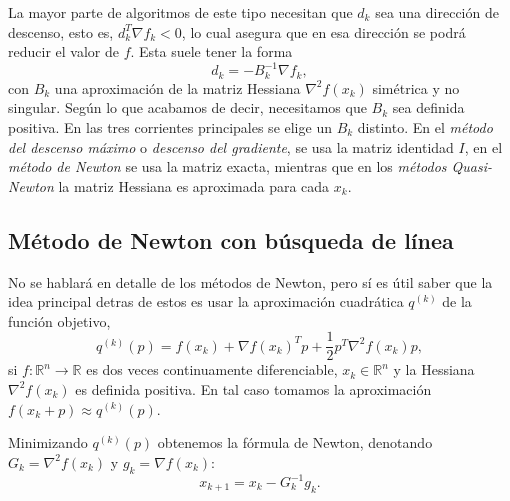 \documentclass[11pt,a4paper]{book}
\theoremstyle{definition}
\theoremstyle{remark}
\begin{document}
La mayor parte de algoritmos de este tipo necesitan que $d_k$ sea una dirección de descenso, esto es, $d_k^T \nabla f_k < 0$,
lo cual asegura que en esa dirección se podrá reducir el valor de $f$. Esta suele tener la forma
\begin{equation}
	d_k = -B_k^{-1} \nabla f_k,
\end{equation}
con $B_k$ una aproximación de la matriz Hessiana $\nabla^2 f(x_k)$ simétrica y no singular. Según lo que acabamos de decir, necesitamos que $B_k$ sea definida positiva. En las tres corrientes principales se elige un $B_k$ distinto. En el \textit{método del descenso máximo} o \textit{descenso del gradiente}, se usa la matriz identidad $I$, en el \textit{método de Newton} se usa la matriz exacta, mientras que en los \textit{métodos Quasi-Newton} la matriz Hessiana es aproximada para cada $x_k$.


\subsection{Método de Newton con búsqueda de línea}
No se hablará en detalle de los métodos de Newton, pero sí es útil saber que la idea principal detras de estos
es usar la aproximación cuadrática $q^{(k)}$ de la función objetivo,
\begin{equation}
	q^{(k)}(p) = f(x_k)+\nabla f(x_k)^Tp + \frac{1}{2}p^T \nabla^2 f(x_k)p,
	\label{eq:NewtonQ}
\end{equation}
si $f:\mathbb{R}^n \rightarrow \mathbb{R}$ es dos veces continuamente diferenciable, $x_k \in \mathbb{R}^n$ y la Hessiana $\nabla^2f(x_k)$ es definida positiva. En tal caso tomamos la aproximación $f(x_k + p) \approx q^{(k)}(p)$.

Minimizando $q^{(k)}(p)$ obtenemos la fórmula de Newton, denotando $G_k=\nabla^2f(x_k)$ y $g_k = \nabla f(x_k)$:
\begin{equation}
	x_{k+1} = x_k - G_k^{-1} g_k.
	\label{eq:NewtonIter}
\end{equation}
\end{document}
